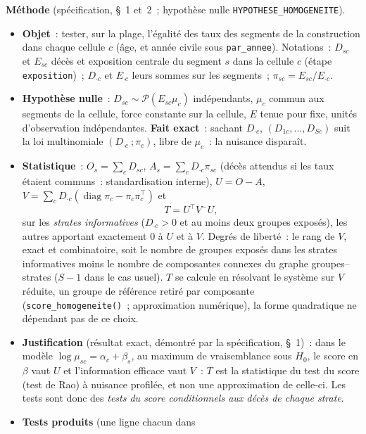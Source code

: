 \documentclass[a4paper,11pt]{article}
\newcommand{\code}[1]{\texttt{\small #1}}
\begin{document}
\medskip
{\sloppy \textbf{Méthode} (spécification, §~1 et~2~; hypothèse nulle
\code{HYPOTHESE\_HOMOGENEITE}).
\begin{itemize}[leftmargin=*, itemsep=2pt]
  \item \textbf{Objet}~: tester, sur la plage, l'égalité des taux des
    segments de la construction dans chaque cellule $c$ (âge, et année
    civile sous \code{par\_annee}). Notations~: $D_{sc}$ et $E_{sc}$ décès
    et exposition centrale du segment $s$ dans la cellule $c$ (étape
    \code{exposition})~; $D_{\cdot c}$ et $E_{\cdot c}$ leurs sommes sur
    les segments~; $\pi_{sc} = E_{sc} / E_{\cdot c}$.
  \item \textbf{Hypothèse nulle}~: $D_{sc} \sim \mathcal{P}(E_{sc}\mu_c)$
    indépendants, $\mu_c$ commun aux segments de la cellule, force
    constante sur la cellule, $E$ tenue pour fixe, unités d'observation
    indépendantes. \textbf{Fait exact}~: sachant $D_{\cdot c}$,
    $(D_{1c}, \ldots, D_{Sc})$ suit la loi multinomiale
    $(D_{\cdot c}~; \pi_c)$, libre de $\mu_c$~: la nuisance disparaît.
  \item \textbf{Statistique}~: $O_s = \sum_c D_{sc}$, $A_s = \sum_c
    D_{\cdot c}\pi_{sc}$ (décès attendus si les taux étaient communs~:
    standardisation interne), $U = O - A$, $V = \sum_c D_{\cdot c}
    (\operatorname{diag}\pi_c - \pi_c\pi_c^{\top})$ et
    \[
      T = U^{\top} V^{-} U ,
    \]
    sur les \emph{strates informatives} ($D_{\cdot c} > 0$ et au moins deux
    groupes exposés), les autres apportant exactement 0 à $U$ et à $V$.
    Degrés de liberté~: le rang de $V$, exact et combinatoire, soit le
    nombre de groupes exposés dans les strates informatives moins le nombre
    de composantes connexes du graphe groupes--strates ($S - 1$ dans le cas
    usuel). $T$ se calcule en résolvant le système sur $V$ réduite, un groupe
    de référence retiré par composante (\code{score\_homogeneite()}~;
    approximation numérique), la forme quadratique ne dépendant pas de ce
    choix.
  \item \textbf{Justification} (résultat exact, démontré par la
    spécification, §~1)~: dans le modèle $\log\mu_{sc} = \alpha_c + \beta_s$,
    au maximum de vraisemblance sous $H_0$, le score en $\beta$ vaut $U$ et
    l'information efficace vaut $V$~: $T$ est la statistique du test du
    score (test de Rao) à nuisance profilée, et non une approximation de
    celle-ci. Les tests sont donc des \emph{tests du score conditionnels aux
    décès de chaque strate}.
  \item \textbf{Tests produits} (une ligne chacun dans

\end{itemize}}
\end{document}
